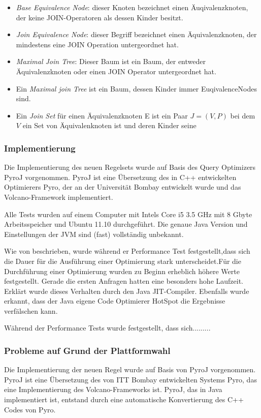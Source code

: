 \begin{itemize}
\item \textit{Base Equivalence Node}: dieser Knoten bezeichnet einen Äuqivalenzknoten, der keine JOIN-Operatoren als dessen Kinder besitzt.
\item \textit{Join Equivalence Node}: dieser Begriff bezeichnet einen Äquivalenzknoten, der mindestens eine JOIN Operation untergeordnet hat.
\item \textit{Maximal Join Tree}: Dieser Baum ist ein Baum, der entweder Äquivalenzknoten oder einen JOIN Operator untergeordnet hat.
\item Ein \textit{Maximal join Tree} ist ein Baum, dessen Kinder immer EuqivalenceNodes sind.
\item Ein \textit{Join Set} für einen Äquivalenzknoten E ist ein Paar $J = (V, P)$ bei dem $V$ ein Set von Äquivalenknoten ist und deren Kinder seine 
\end{itemize}


\subsubsection{Implementierung}
Die Implementierung des neuen Regelsets wurde auf Basis des Query Optimizers PyroJ vorgenommen. PyroJ ist eine Übersetzung des in C++ entwickelten Optimierers Pyro, der an der Universität Bombay entwickelt wurde und das Volcano-Framework implementiert.

Alle Tests wurden auf einem Computer mit Intels Core i5 3.5 GHz mit 8 Gbyte Arbeitsspeicher und Ubuntu 11.10 durchgeführt. Die genaue Java Version und Einstellungen der JVM sind (fast) vollständig unbekannt.

Wie von \cite{shanbhag2014optimizing} beschrieben, wurde während er Performance Test festgestellt,dass sich die Dauer für die Ausführung einer Optimierung stark unterscheidet.Für die Durchführung einer Optimierung wurden zu Beginn erheblich höhere Werte festgestellt. Gerade die ersten Anfragen hatten eine besonders hohe Laufzeit. Erklärt wurde dieses Verhalten durch den Java \ac{JIT}-Compiler. Ebenfalls wurde erkannt, dass der Java eigene Code Optimierer HotSpot die Ergebnisse verfälschen kann. 

Während der Performance Tests wurde festgestellt, dass sich.........


\subsubsection{Probleme auf Grund der Plattformwahl}
Die Implementierung der neuen Regel wurde auf Basis von PyroJ vorgenommen. PyroJ ist eine Übersetzung des von ITT Bombay entwickelten Systems Pyro, das eine Implementierung des Volcano-Frameworks ist. PyroJ, das in Java implementiert ist, entstand durch eine automatische Konvertierung des C++ Codes von Pyro. 

